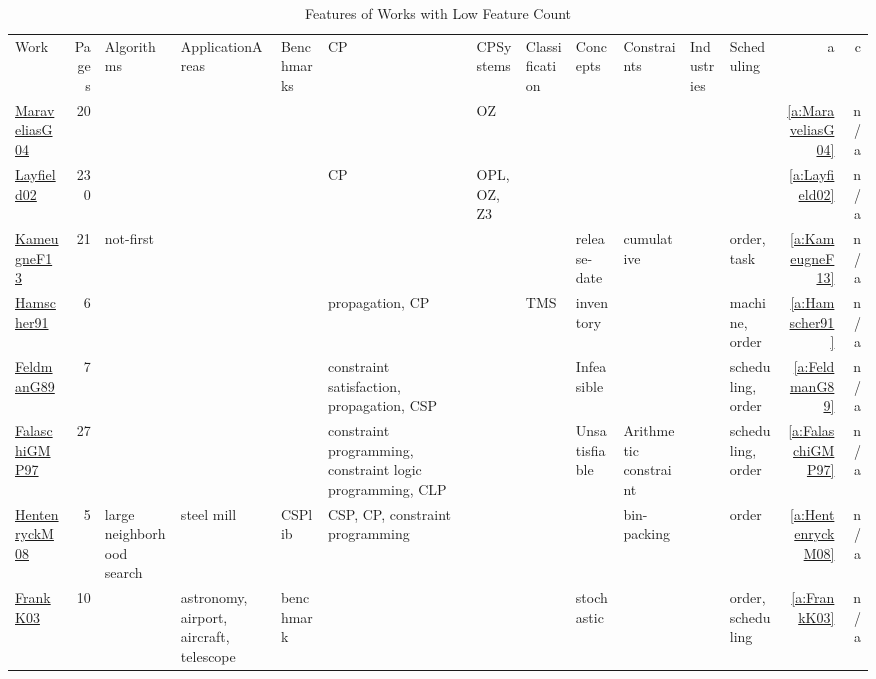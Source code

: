 {\scriptsize
\begin{longtable}{>{\raggedright\arraybackslash}p{3cm}r>{\raggedright\arraybackslash}p{1.5cm}>{\raggedright\arraybackslash}p{1.5cm}>{\raggedright\arraybackslash}p{1.5cm}>{\raggedright\arraybackslash}p{1.5cm}>{\raggedright\arraybackslash}p{1.5cm}>{\raggedright\arraybackslash}p{1.5cm}>{\raggedright\arraybackslash}p{1.5cm}>{\raggedright\arraybackslash}p{1.5cm}>{\raggedright\arraybackslash}p{1.5cm}>{\raggedright\arraybackslash}p{1.5cm}rr}
\rowcolor{white}\caption{Features of Works with Low Feature Count}\\ \toprule
\rowcolor{white}Work & Pages & Algorithms& ApplicationAreas& Benchmarks& CP& CPSystems& Classification& Concepts& Constraints& Industries& Scheduling & a & c\\ \midrule\endhead
\bottomrule
\endfoot
\href{../works/MaraveliasG04.pdf}{MaraveliasG04}~\cite{MaraveliasG04} & 20 &  &  &  &  & OZ &  &  &  &  &  & \ref{a:MaraveliasG04} & n/a\\
\href{../works/Layfield02.pdf}{Layfield02}~\cite{Layfield02} & 230 &  &  &  & CP & OPL, OZ, Z3 &  &  &  &  &  & \ref{a:Layfield02} & n/a\\
\href{../works/KameugneF13.pdf}{KameugneF13}~\cite{KameugneF13} & 21 & not-first &  &  &  &  &  & release-date & cumulative &  & order, task & \ref{a:KameugneF13} & n/a\\
\href{../works/Hamscher91.pdf}{Hamscher91}~\cite{Hamscher91} & 6 &  &  &  & propagation, CP &  & TMS & inventory &  &  & machine, order & \ref{a:Hamscher91} & n/a\\
\href{../works/FeldmanG89.pdf}{FeldmanG89}~\cite{FeldmanG89} & 7 &  &  &  & constraint satisfaction, propagation, CSP &  &  & Infeasible &  &  & scheduling, order & \ref{a:FeldmanG89} & n/a\\
\href{../works/FalaschiGMP97.pdf}{FalaschiGMP97}~\cite{FalaschiGMP97} & 27 &  &  &  & constraint programming, constraint logic programming, CLP &  &  & Unsatisfiable & Arithmetic constraint &  & scheduling, order & \ref{a:FalaschiGMP97} & n/a\\
\href{../works/HentenryckM08.pdf}{HentenryckM08}~\cite{HentenryckM08} & 5 & large neighborhood search & steel mill & CSPlib & CSP, CP, constraint programming &  &  &  & bin-packing &  & order & \ref{a:HentenryckM08} & n/a\\
\href{../works/FrankK03.pdf}{FrankK03}~\cite{FrankK03} & 10 &  & astronomy, airport, aircraft, telescope & benchmark &  &  &  & stochastic &  &  & order, scheduling & \ref{a:FrankK03} & n/a\\

\end{longtable}}
